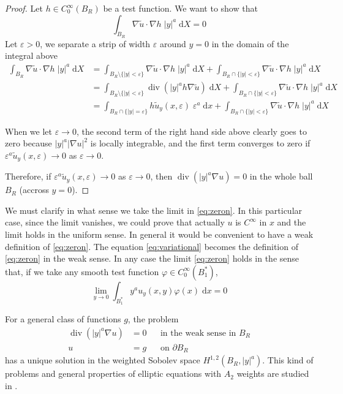 \documentclass[letterpaper]{article}
\numberwithin{equation}{section}
\newcommand{\abs}[1]{\left\vert#1\right\vert}
\newcommand{\eps}{\varepsilon}
\newcommand{\grad} {\nabla}
\newcommand{\bdary} {\partial}
\newcommand{\dx} {\; \mathrm{d} x}
\newcommand{\dd} {\; \mathrm{d}}
\DeclareMathOperator{\dv}{div}
\begin{document}
\begin{proof}
Let $h \in C^\infty_0 (B_R)$ be a test function. We want to show that
\begin{equation} \label{eq:variational}
 \int_{B_R} \grad \tilde u \cdot \grad h \; |y|^a \dd X = 0
\end{equation}
Let $\eps > 0$, we separate a strip of width $\eps$ around $y=0$ in the domain of the integral above
\begin{align*}
 \int_{B_R} \grad \tilde u \cdot \grad h \; |y|^a \dd X &= \int_{B_R \setminus \{ \abs{y} < \eps \} } \grad \tilde u \cdot \grad h \; |y|^a \dd X + \int_{B_R \cap \{ \abs{y} < \eps \} } \grad \tilde u \cdot \grad h \; |y|^a \dd X \\
 &= \int_{B_R \setminus \{ \abs{y} < \eps \} } \dv \left( |y|^a h \grad \tilde u \right) \dd X + \int_{B_R \cap \{ \abs{y} < \eps \} } \grad \tilde u \cdot \grad h \; |y|^a \dd X \\
 &= \int_{B_R \cap \{ \abs{y} = \eps \} } h \tilde u_y (x,\eps) \; \eps^a \dd x + \int_{B_R \cap \{ \abs{y} < \eps \} } \grad \tilde u \cdot \grad h \; |y|^a \dd X
\end{align*}

When we let $\eps \to 0$, the second term of the right hand side above clearly goes to zero because $|y|^a \abs{\grad u}^2$ is locally integrable, and the first term converges to zero if $\eps^a \tilde u_y(x,\eps) \to 0$ as $\eps \to 0$.

Therefore, if $\eps^a \tilde u_y(x,\eps) \to 0$ as $\eps \to 0$, then $\dv(|y|^a \grad u)=0$ in the whole ball $B_R$ (accross $y=0$).
\end{proof}

We must clarify in what sense we take the limit in \eqref{eq:zeron}. In this particular case, since the limit vanishes, we could prove that actually $u$ is $C^\infty$ in $x$ and the limit holds in the uniform sense. In general it would be convenient to have a weak definition of \eqref{eq:zeron}. The equation \eqref{eq:variational} becomes the definition of \eqref{eq:zeron} in the weak sense. In any case the limit \eqref{eq:zeron} holds in the sense that, if we take any smooth test function $\varphi \in C^\infty_0 (B_1^*)$, \[\lim_{y \to 0} \int_{B_1^*} y^a u_y(x,y) \varphi(x) \dx = 0\]

For a general class of functions $g$, the problem
\begin{align*}
\dv (\abs{y}^a \grad u) &= 0 &&\text{in the weak sense in } B_R \\
u &= g && \text{on } \bdary B_R
\end{align*}
has a unique solution in the weighted Sobolev space $H^{1,2} (B_R, \abs{y}^a)$. This kind of problems and general properties of elliptic equations with $A_2$ weights are studied in \cite{FKS}.
\end{document}
